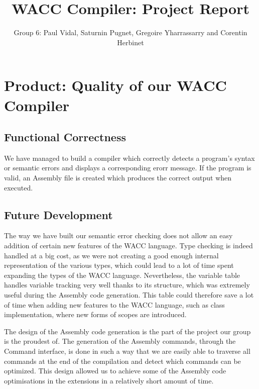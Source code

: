 \documentclass[a4wide, 11pt]{article}
\begin{document}
\title{WACC Compiler: Project Report}
\author{Group 6: Paul Vidal, Saturnin Pugnet, Gregoire Yharrassarry and Corentin Herbinet}
\maketitle



\section{Product: Quality of our WACC Compiler}

\subsection{Functional Correctness}

We have managed to build a compiler which correctly detects a program's syntax or semantic errors and displays a corresponding erorr message.
If the program is valid, an Assembly file is created which produces the correct output when executed.

\subsection{Future Development}

The way we have built our semantic error checking does not allow an easy addition of certain new features of the WACC language. Type checking is indeed handled at a big cost, as we were not creating a good enough internal representation of the various types, which could lead to a lot of time spent expanding the types of the WACC language. Nevertheless, the variable table handles variable tracking very well thanks to its structure, which was extremely useful during the Assembly code generation. This table could therefore save a lot of time when adding new features to the WACC language, such as class implementation, where new forms of scopes are introduced.

\bigskip

The design of the Assembly code generation is the part of the project our group is the proudest of. The generation of the Assembly commands, through the Command interface, is done in such a way that we are easily able to traverse all commands at the end of the compilation and detect which commands can be optimized. This design allowed us to achieve some of the Assembly code optimisations in the extensions in a relatively short amount of time.
\end{document}
